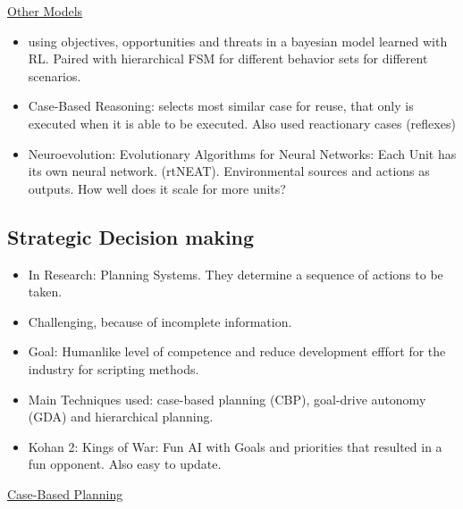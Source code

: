 \underline{Other Models}
\begin{itemize}[noitemsep,nolistsep]
	\item using objectives, opportunities and threats in a bayesian model learned with RL. Paired with hierarchical FSM for different behavior sets for different scenarios.
	\item Case-Based Reasoning: selects most similar case for reuse, that only is executed when it is able to be executed. Also used reactionary cases (reflexes)
	\item Neuroevolution: Evolutionary Algorithms for Neural Networks: Each Unit has its own neural network. (rtNEAT). Environmental sources and actions as outputs. How well does it scale for more units?
\end{itemize}

\subsection{Strategic Decision making}
\begin{itemize}[noitemsep,nolistsep]
	\item In Research: Planning Systems. They determine a sequence of actions to be taken.
	\item Challenging, because of incomplete information.
	\item Goal: Humanlike level of competence and reduce development efffort for the industry for scripting methods.
	\item Main Techniques used: case-based planning (CBP), goal-drive autonomy (GDA) and hierarchical planning.
	\item Kohan 2: Kings of War: Fun AI with Goals and priorities that resulted in a fun opponent. Also easy to update.
\end{itemize}
\underline{Case-Based Planning}
